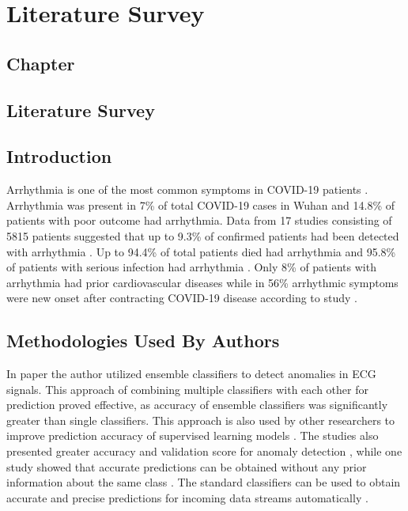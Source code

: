 \thispagestyle{fancy}
\chapter{Literature Survey} \label{ch:literature_survey}
\section*{\centering Chapter \thechapter}
\section*{\centering Literature Survey}
\nocite{*}

\section{Introduction} \label{sec:introduction_literature_survey}

Arrhythmia is one of the most common symptoms in COVID-19 patients \cite{babapoor2020arrhythmia}. Arrhythmia was present in 7\% of total COVID-19 cases in Wuhan and 14.8\% of patients with poor outcome had arrhythmia. Data from 17 studies consisting of 5815 patients suggested that up to 9.3\% of confirmed patients had been detected with arrhythmia \cite{mulia2021atrial, liu2020clinical}. Up to 94.4\% of total patients died had arrhythmia and 95.8\% of patients with serious infection had arrhythmia \cite{beri2020cardiac,ren2020clinical}. Only 8\% of patients with arrhythmia had prior cardiovascular diseases while in 56\% arrhythmic symptoms were new onset after contracting COVID-19 disease according to study \cite{babapoor2020arrhythmia, liu2020clinical, yarmohammadi2021frequency}.

\section{Methodologies Used By Authors} \label{sec:methodologies_used_by_authors}

In paper \cite{sun2020multi} the author utilized ensemble classifiers to detect anomalies in ECG signals. This approach of combining multiple classifiers with each other for prediction proved effective, as accuracy of ensemble classifiers was significantly greater than single classifiers. This approach is also used by other researchers to improve prediction accuracy of supervised learning models \cite{huang2020accurate,rajak2020applying,liu2020parallel}. The studies also presented greater accuracy and validation score for anomaly detection \cite{huang2020accurate,liu2020parallel}, while one study showed that accurate predictions can be obtained without any prior information about the same class \cite{rajak2020applying}. The standard classifiers can be used to obtain accurate and precise predictions for incoming data streams automatically \cite{imbrea2021automated}.

